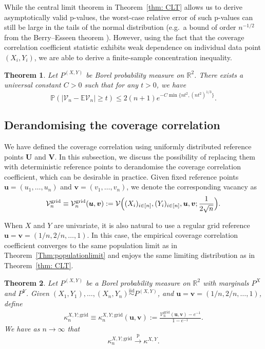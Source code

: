 \documentclass[11pt]{article}
\newtheorem{thm}{Theorem}
\newcommand{\pto}{\xrightarrow{\,\mathrm{p}\,} }
\newcommand{\iid}{\stackrel{\mathrm{iid}}\sim}
\newcommand{\bs}[1]{\boldsymbol{#1}}
\begin{document}
While the central limit theorem in Theorem~\ref{thm: CLT} allows us to derive asymptotically valid p-values, the worst-case relative error of such p-values can still be large in the tails of the normal distribution (e.g.\ a bound of order $n^{-1/2}$ from the Berry--Esseen theorem \citep{berry1941accuracy,esseen1942liapunov}). However, using the fact that the coverage correlation coefficient statistic exhibits weak dependence on individual data point $(X_i, Y_i)$, we are able to derive a finite-sample concentration inequality.

\begin{thm} \label{thm: concentration}
Let $P^{(X,Y)}$ be Borel probability measure on $\mathbb{R}^2$. There exists a universal constant $C>0$ such that for any $t > 0$, we have
\[
   \mathbb{P}(|\mathcal{V}_n - \mathbb{E}\mathcal{V}_n| \geq t) \leq 2(n+1)e^{-C\min\{nt^2, (nt^2)^{1/3}\}}.
\]
\end{thm}


\subsection{Derandomising the coverage correlation}
\label{sec: derandomising}
We have defined the coverage correlation using uniformly distributed reference points $\bs{U}$ and $\bs{V}$. In this subsection, we discuss the possibility of replacing them with deterministic reference points to derandomise the coverage correlation coefficient, which can be desirable in practice.  Given fixed reference points $\bs{u} = (u_1,\ldots,u_n)$ and $\bs{v} = (v_1,\ldots,v_n)$, we denote the corresponding vacancy as 
\begin{align}
\mathcal{V}_n^{\mathrm{grid}} \equiv \mathcal{V}_n^{\mathrm{grid}}(\bs{u},\bs{v}) := \mathcal{V}\Bigl((X_i)_{i\in[n]},(Y_i)_{i\in[n]},\bs{u},\bs{v};\frac{1}{2\sqrt{n}}\Bigr). \label{eq:RegularGridVacancy}
\end{align}

When $X$ and $Y$ are univariate, it is also natural to use a regular grid reference $\bs{u} = \bs{v} = (1/n, 2/n, \ldots, 1)$. In this case, the empirical coverage correlation coefficient converges to the same population limit as in Theorem~\ref{Thm:populationlimit} and enjoys the same limiting distribution as in Theorem~\ref{thm: CLT}.

\begin{thm}
\label{Thm:PopulationLimitGrid}
Let $P^{(X,Y)}$ be a Borel probability measure on $\mathbb{R}^2$ with marginals $P^X$ and $P^Y$. Given $(X_1,Y_1),\ldots,(X_n,Y_n)\iid P^{(X,Y)}$, and $\bs{u} = \bs{v} = (1/n,2/n,\ldots,1)$, define
\begin{align}
\kappa_n^{X,Y;\mathrm{grid}} \equiv \kappa_n^{X,Y;\mathrm{grid}}(\bs{u},\bs{v}) := \frac{\mathcal{V}_n^{\mathrm{grid}}(\bs{u},\bs{v})-e^{-1}}{1-e^{-1}}. \label{eq:CovCorrGrid}
\end{align}
We have as $n \to \infty$ that
\[
\kappa_n^{X,Y; \mathrm{grid}} \pto \kappa^{X,Y}.
\]
\end{thm}
\end{document}
